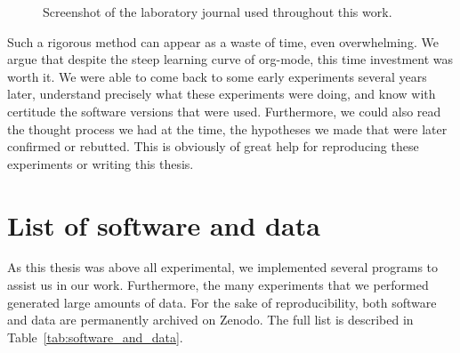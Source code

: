     \begin{figure}[htpb]
        \centering
        \caption{Screenshot of the laboratory journal used throughout this work.}%
        \label{fig:appendix:journal_extract}
    \end{figure}

    Such a rigorous method can appear as a waste of time, even overwhelming. We argue that despite the steep learning
    curve of org-mode, this time investment was worth it. We were able to come back to some early experiments several
    years later, understand precisely what these experiments were doing, and know with certitude the software versions
    that were used. Furthermore, we could also read the thought process we had at the time, the hypotheses we made that were later
    confirmed or rebutted. This is obviously of great help for reproducing these experiments or writing this thesis.

\chapter{List of software and data}
\label{chapter:zenodo}
    As this thesis was above all experimental, we implemented several programs to assist us in our work. Furthermore,
    the many experiments that we performed generated large amounts of data.  For the sake of reproducibility, both
    software and data are permanently archived on Zenodo. The full list is described in
    Table~\ref{tab:software_and_data}.

